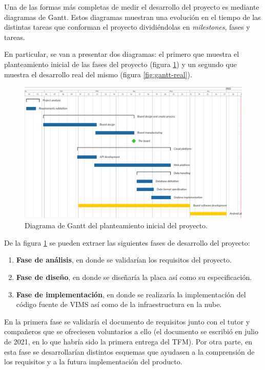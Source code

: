 Una de las formas más completas de medir el desarrollo del proyecto es mediante
diagramas de Gantt. Estos diagramas muestran una evolución en el tiempo de
las distintas tareas que conforman el proyecto dividiéndolas en \textit{milestones},
fases y tareas.

En particular, se van a presentar dos diagramas: el primero que muestra el
planteamiento inicial de las fases del proyecto (figura \ref{fig:gantt-original})
y un segundo que muestra el desarrollo real del mismo (figura \ref{fig:gantt-real}).

\begin{figure}[H]
  \centering
  \includegraphics[width=\linewidth]{images/gantt-chart-original.png}
  \caption{Diagrama de Gantt del planteamiento inicial del proyecto.}
  \label{fig:gantt-original}
\end{figure}

De la figura \ref{fig:gantt-original} se pueden extraer las siguientes fases de
desarrollo del proyecto:

\begin{enumerate}
  \item \textbf{Fase de análisis}, en donde se validarían los requisitos del
        proyecto.
  \item \textbf{Fase de diseño}, en donde se diseñaría la placa así como su
        especificación.
  \item \textbf{Fase de implementación}, en donde se realizaría la implementación
        del código fuente de \ac{VIMS} así como de la infraestructura en la nube.
\end{enumerate}

En la primera fase se validaría el documento de requisitos junto con el tutor y
compañeros que se ofreciesen voluntarios a ello (el documento se escribió en julio
de 2021, en lo que habría sido la primera entrega del TFM). Por otra parte, en esta
fase se desarrollarían distintos esquemas que ayudasen a la comprensión de los
requisitos y a la futura implementación del producto.

